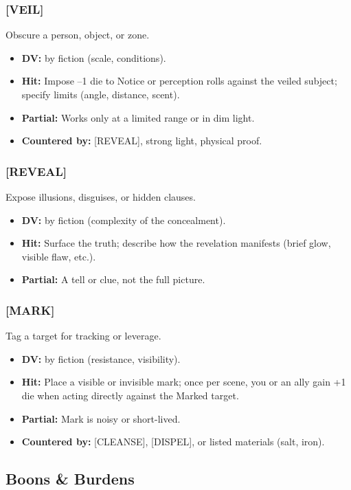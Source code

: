 \subsubsection{[VEIL]}
Obscure a person, object, or zone.
\begin{itemize}
  \item \textbf{DV:} by fiction (scale, conditions).
  \item \textbf{Hit:} Impose --1 die to Notice or perception rolls against the veiled subject; specify limits (angle, distance, scent).
  \item \textbf{Partial:} Works only at a limited range or in dim light.
  \item \textbf{Countered by:} [REVEAL], strong light, physical proof.
\end{itemize}

\subsubsection{[REVEAL]}
Expose illusions, disguises, or hidden clauses.
\begin{itemize}
  \item \textbf{DV:} by fiction (complexity of the concealment).
  \item \textbf{Hit:} Surface the truth; describe how the revelation manifests (brief glow, visible flaw, etc.).
  \item \textbf{Partial:} A tell or clue, not the full picture.
\end{itemize}

\subsubsection{[MARK]}
Tag a target for tracking or leverage.
\begin{itemize}
  \item \textbf{DV:} by fiction (resistance, visibility).
  \item \textbf{Hit:} Place a visible or invisible mark; once per scene, you or an ally gain +1 die when acting directly against the Marked target.
  \item \textbf{Partial:} Mark is noisy or short-lived.
  \item \textbf{Countered by:} [CLEANSE], [DISPEL], or listed materials (salt, iron).
\end{itemize}

\subsection{Boons \& Burdens}


